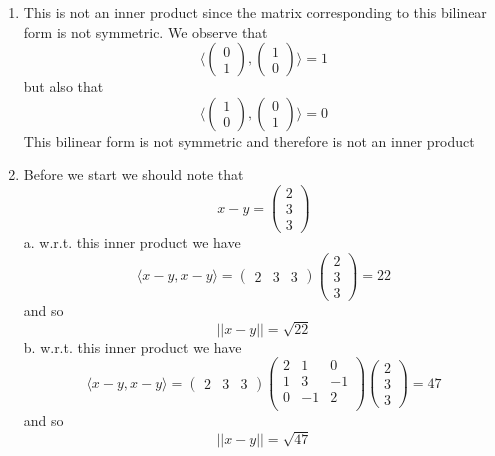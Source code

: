 \documentclass{article}
\newcommand{\chapternumber}{3}
\newenvironment{QandA}{\begin{enumerate}[label=\chapternumber.\arabic*]\bfseries\boldmath}
	{\end{enumerate}}
\newenvironment{answered}{\par\bigskip\normalfont\unboldmath}{}
\begin{document}
\begin{QandA}
		\item 
		\begin{answered}
			This is not an inner product since the matrix corresponding to this bilinear form is not symmetric. We observe that
			\[
			\langle
			\begin{pmatrix}
				0 \\ 1
			\end{pmatrix},
			\begin{pmatrix}
				1 \\ 0
			\end{pmatrix}
			\rangle = 1
			\]
			but also that
			\[
			\langle
			\begin{pmatrix}
				1 \\ 0
			\end{pmatrix},
			\begin{pmatrix}
				0 \\ 1
			\end{pmatrix}
			\rangle = 0
			\]
			This bilinear form is not symmetric and therefore is not an inner product
		\end{answered}
		
		\item 
		\begin{answered}
			Before we start we should note that
			\[x-y = 
			\begin{pmatrix}
				2 \\ 3 \\ 3
			\end{pmatrix}
			\]
			a. w.r.t. this inner product we have
			\[
			\langle x-y, x-y\rangle
			=
			\begin{pmatrix}
				2 & 3 & 3
			\end{pmatrix}
			\begin{pmatrix}
				2 \\ 3 \\ 3
			\end{pmatrix}
			=
			22
			\]
			and so
			\[||x-y||=\sqrt{22}\]
			b. w.r.t. this inner product we have
			\[
			\langle x-y, x-y\rangle
			=
			\begin{pmatrix}
				2 & 3 & 3
			\end{pmatrix}
			\begin{pmatrix}
				2 & 1 & 0 \\
				1 & 3 & -1 \\
				0 & -1 & 2 \\
			\end{pmatrix}
			\begin{pmatrix}
				2 \\ 3 \\ 3
			\end{pmatrix}
			=
			47
			\]
			and so
			\[||x-y||=\sqrt{47}\]
		\end{answered}
		

\end{QandA}
\end{document}
